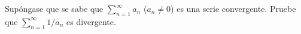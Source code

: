 \item Supóngase que se sabe que $\sum_{n=1}^\infty a_n$ ($a_n \ne 0$) es una serie convergente. Pruebe que $\sum_{n=1}^\infty 1/a_n$ es divergente.
